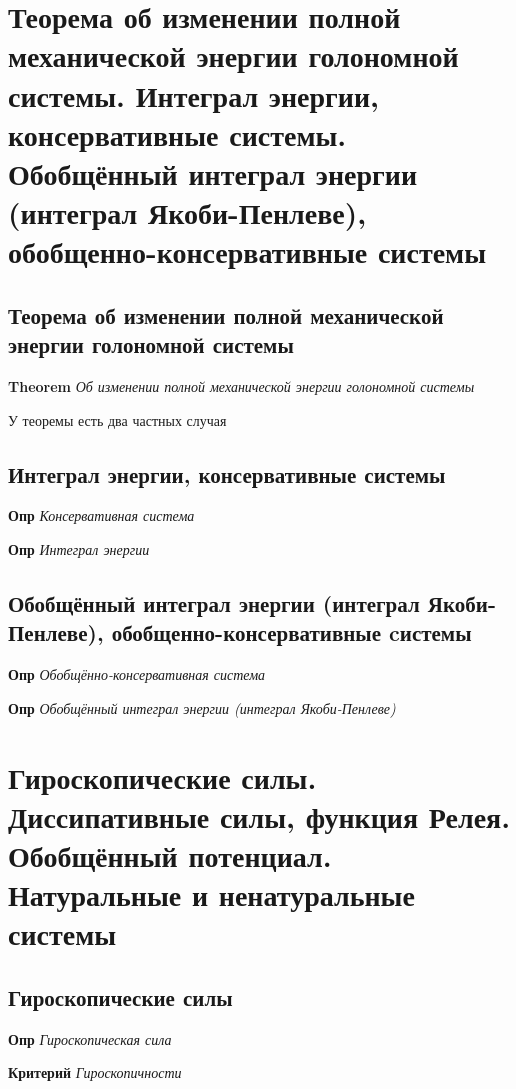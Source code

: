 \documentclass[a4paper, 14pt]{article}
\begin{document}
    \section{Теорема об изменении полной механической энергии голономной системы.
    Интеграл энергии, консервативные системы.
    Обобщённый интеграл энергии (интеграл Якоби-Пенлеве), обобщенно-консервативные системы}
    
    \subsection{Теорема об изменении полной механической энергии голономной системы}
    
    \textbf{Theorem} \textit{Об изменении полной механической энергии голономной системы}
    
    У теоремы есть два частных случая
    
    \subsection{Интеграл энергии, консервативные системы}
    
    \textbf{Опр} \textit{Консервативная система}
    
    \textbf{Опр} \textit{Интеграл энергии}
    
    \subsection{Обобщённый интеграл энергии (интеграл Якоби-Пенлеве), обобщенно-консервативные cистемы}

    \textbf{Опр} \textit{Обобщённо-консервативная система}
    
    \textbf{Опр} \textit{Обобщённый интеграл энергии (интеграл Якоби-Пенлеве)}
    
    \section{Гироскопические силы.
    Диссипативные силы, функция Релея.
    Обобщённый потенциал.
    Натуральные и ненатуральные системы}
    
    \subsection{Гироскопические силы}
    
    \textbf{Опр} \textit{Гироскопическая сила}
    
    \textbf{Критерий} \textit{Гироскопичности}
    
\end{document}
